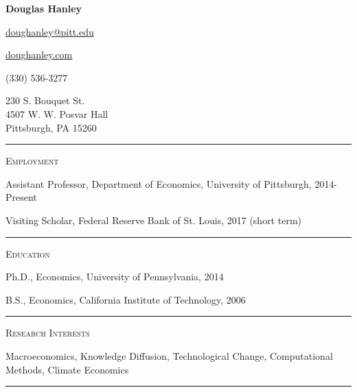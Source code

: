 \documentclass{article}
\begin{document}
\thispagestyle{empty}

\begin{center}
{\LARGE \textbf{Douglas Hanley}}
\end{center}

\begin{center}
\parbox{2.0in}{
\begin{flushright}
\href{mailto:doughanley@pitt.edu}{doughanley@pitt.edu} 

\href{http://doughanley.com/}{doughanley.com} 

(330) 536-3277
\end{flushright}
}
\hspace{0.5cm}
\parbox{2.0in}{
230 S. Bouquet St. \\
4507 W. W. Posvar Hall \\
Pittsburgh, PA 15260
}
\end{center}

\hspace{-0.025\textwidth}\rule{1.05\textwidth}{0.1mm}

\vspace{0.3cm}


\parbox{\textwidth}{
\parbox[t]{0.28\textwidth}{ \raggedright \noindent \textsc{ Employment } }
\parbox[t]{0.72\textwidth}{ \raggedright

Assistant Professor, Department of Economics, University of Pittsburgh, 2014-Present
\vspace{0.27cm}

Visiting Scholar, Federal Reserve Bank of St. Louis, 2017 (short term)
\vspace{0.27cm}

}
\textcolor{light-gray}{\hrule}
}
\vspace{0.3cm}

\parbox{\textwidth}{
\parbox[t]{0.28\textwidth}{ \raggedright \noindent \textsc{ Education } }
\parbox[t]{0.72\textwidth}{ \raggedright

Ph.D., Economics, University of Pennsylvania, 2014
\vspace{0.27cm}

B.S., Economics, California Institute of Technology, 2006
\vspace{0.27cm}

}
\textcolor{light-gray}{\hrule}
}
\vspace{0.3cm}

\parbox{\textwidth}{
\parbox[t]{0.28\textwidth}{ \raggedright \noindent \textsc{ Research Interests } }
\parbox[t]{0.72\textwidth}{ \raggedright

Macroeconomics, Knowledge Diffusion, Technological Change, Computational Methods, Climate Economics
\vspace{0.27cm}

}
\textcolor{light-gray}{\hrule}
}
\vspace{0.3cm}
\end{document}
